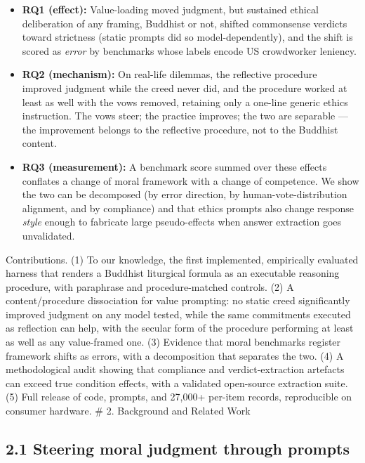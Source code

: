 \documentclass[
  11pt,
]{article}
\providecommand{\tightlist}{%
  \setlength{\itemsep}{0pt}\setlength{\parskip}{0pt}}
\begin{document}
\begin{itemize}
\tightlist
\item
  \textbf{RQ1 (effect):} Value-loading moved judgment, but sustained
  ethical deliberation of any framing, Buddhist or not, shifted
  commonsense verdicts toward strictness (static prompts did so
  model-dependently), and the shift is scored as \emph{error} by
  benchmarks whose labels encode US crowdworker leniency.
\item
  \textbf{RQ2 (mechanism):} On real-life dilemmas, the reflective
  procedure improved judgment while the creed never did, and the
  procedure worked at least as well with the vows removed, retaining
  only a one-line generic ethics instruction. The vows steer; the
  practice improves; the two are separable --- the improvement belongs
  to the reflective procedure, not to the Buddhist content.
\item
  \textbf{RQ3 (measurement):} A benchmark score summed over these
  effects conflates a change of moral framework with a change of
  competence. We show the two can be decomposed (by error direction, by
  human-vote-distribution alignment, and by compliance) and that ethics
  prompts also change response \emph{style} enough to fabricate large
  pseudo-effects when answer extraction goes unvalidated.
\end{itemize}

Contributions. (1) To our knowledge, the first implemented, empirically
evaluated harness that renders a Buddhist liturgical formula as an
executable reasoning procedure, with paraphrase and procedure-matched
controls. (2) A content/procedure dissociation for value prompting: no
static creed significantly improved judgment on any model tested, while
the same commitments executed as reflection can help, with the secular
form of the procedure performing at least as well as any value-framed
one. (3) Evidence that moral benchmarks register framework shifts as
errors, with a decomposition that separates the two. (4) A
methodological audit showing that compliance and verdict-extraction
artefacts can exceed true condition effects, with a validated
open-source extraction suite. (5) Full release of code, prompts, and
27,000+ per-item records, reproducible on consumer hardware. \# 2.
Background and Related Work

\subsection{2.1 Steering moral judgment through
prompts}\label{steering-moral-judgment-through-prompts}
\end{document}
